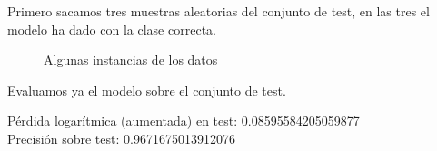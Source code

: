 \documentclass[a4]{article}
\begin{document}
Primero sacamos tres muestras aleatorias del conjunto de test, en
las tres el modelo ha dado con la clase correcta.

\vspace{-5mm}
\begin{figure}[H]
  \centering
  \caption{Algunas instancias de los datos}
  \label{fig:tests-samples}
\end{figure}
\vspace{-5mm}

Evaluamos ya el modelo sobre el conjunto de test.

Pérdida logarítmica (aumentada) en test: 0.08595584205059877 \\
Precisión sobre test: 0.9671675013912076
\end{document}
